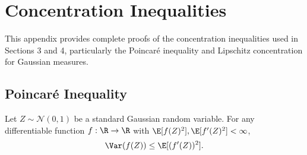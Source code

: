 
\section{Concentration Inequalities}

This appendix provides complete proofs of the concentration inequalities used in Sections 3 and 4, particularly the Poincaré inequality and Lipschitz concentration for Gaussian measures.

\subsection{Poincaré Inequality}

\begin{theorem}\label{thm:poincare-standard}
Let $Z \sim \mathcal{N}(0, 1)$ be a standard Gaussian random variable. For any differentiable function $f: \R \to \R$ with $\E[f(Z)^2], \E[f'(Z)^2] < \infty$,
\begin{equation}\label{eq:poincare-standard}
\Var(f(Z)) \leq \E[(f'(Z))^2].
\end{equation}
\end{theorem}

